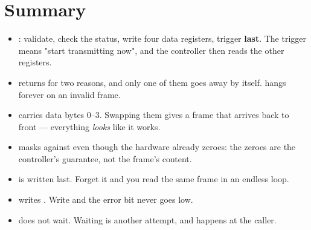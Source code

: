 \section*{Summary}

\begin{itemize}
  \item {}: validate, check the status, write four data registers, trigger
    \textbf{last}. The trigger means "start transmitting now", and the controller then reads the
    other registers.
  \item {} returns  for two reasons, and only one of them goes away by
    itself.  hangs forever on an invalid frame.
  \item {} carries data bytes 0--3. Swapping them gives a frame that arrives back
    to front --- everything \emph{looks} like it works.
  \item {} masks against  even though the hardware already zeroes: the
    zeroes are the controller's guarantee, not the frame's content.
  \item {} is written last. Forget it and you read the same frame in an endless loop.
  \item {} writes . Write  and the error bit never goes low.
  \item {} does not wait. Waiting is another attempt, and happens at the caller.
\end{itemize}
